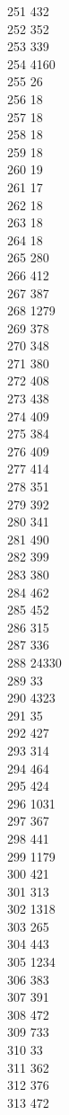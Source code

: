 { 251	432 \\
 252	352 \\
 253	339 \\
 254	4160 \\
 255	26 \\
 256	18 \\
 257	18 \\
 258	18 \\
 259	18 \\
 260	19 \\
 261	17 \\
 262	18 \\
 263	18 \\
 264	18 \\
 265	280 \\
 266	412 \\
 267	387 \\
 268	1279 \\
 269	378 \\
 270	348 \\
 271	380 \\
 272	408 \\
 273	438 \\
 274	409 \\
 275	384 \\
 276	409 \\
 277	414 \\
 278	351 \\
 279	392 \\
 280	341 \\
 281	490 \\
 282	399 \\
 283	380 \\
 284	462 \\
 285	452 \\
 286	315 \\
 287	336 \\
 288	24330 \\
 289	33 \\
 290	4323 \\
 291	35 \\
 292	427 \\
 293	314 \\
 294	464 \\
 295	424 \\
 296	1031 \\
 297	367 \\
 298	441 \\
 299	1179 \\
 300	421 \\
 301	313 \\
 302	1318 \\
 303	265 \\
 304	443 \\
 305	1234 \\
 306	383 \\
 307	391 \\
 308	472 \\
 309	733 \\
 310	33 \\
 311	362 \\
 312	376 \\
 313	472 \\
}
